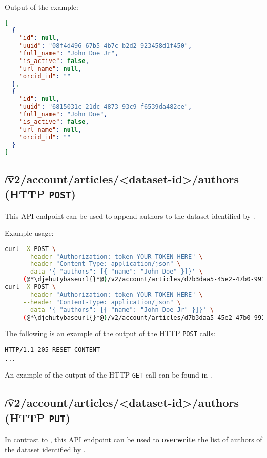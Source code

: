   Output of the example:
\begin{lstlisting}[language=JSON]
[
  {
    "id": null,
    "uuid": "08f4d496-67b5-4b7c-b2d2-923458d1f450",
    "full_name": "John Doe Jr",
    "is_active": false,
    "url_name": null,
    "orcid_id": ""
  },
  {
    "id": null,
    "uuid": "6815031c-21dc-4873-93c9-f6539da482ce",
    "full_name": "John Doe",
    "is_active": false,
    "url_name": null,
    "orcid_id": ""
  }
]
\end{lstlisting}

\subsection{\t{/v2/account/articles/<dataset-id>/authors} (HTTP \texttt{POST})}
\label{sec:api-v2-articles-authors-post}

  This API endpoint can be used to append authors to the dataset identified
  by .

  Example usage:
\begin{lstlisting}[language=bash]
curl -X POST \
     --header "Authorization: token YOUR_TOKEN_HERE" \
     --header "Content-Type: application/json" \
     --data '{ "authors": [{ "name": "John Doe" }]}' \
     (@*\djehutybaseurl{}*@)/v2/account/articles/d7b3daa5-45e2-47b0-9910-0f7fa6a995b1/authors
curl -X POST \
     --header "Authorization: token YOUR_TOKEN_HERE" \
     --header "Content-Type: application/json" \
     --data '{ "authors": [{ "name": "John Doe Jr" }]}' \
     (@*\djehutybaseurl{}*@)/v2/account/articles/d7b3daa5-45e2-47b0-9910-0f7fa6a995b1/authors
\end{lstlisting}

  The following is an example of the output of the HTTP \texttt{POST} calls:
\begin{lstlisting}
HTTP/1.1 205 RESET CONTENT
...
\end{lstlisting}

  An example of the output of the HTTP \texttt{GET} call can be found in
  .

\subsection{\t{/v2/account/articles/<dataset-id>/authors} (HTTP \texttt{PUT})}

  In contrast to , this API endpoint
  can be used to \textbf{overwrite} the list of authors of the dataset identified
  by .

